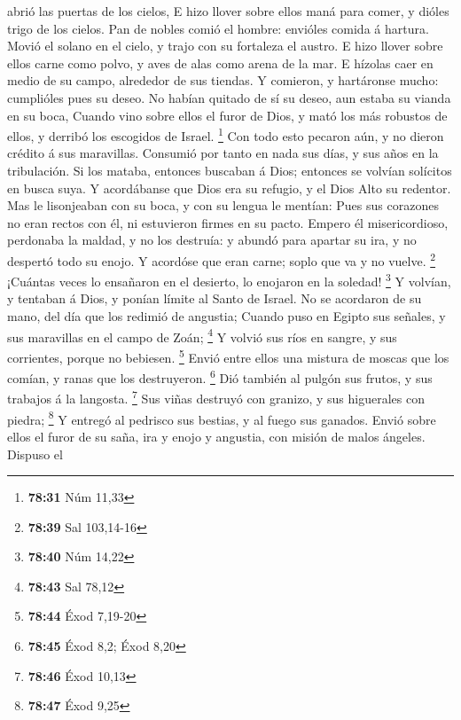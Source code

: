 abrió las puertas de los cielos,  E hizo llover sobre ellos
maná para comer, y dióles trigo de los cielos.  Pan de
nobles comió el hombre: envióles comida á hartura.  Movió
el solano en el cielo, y trajo con su fortaleza el austro. 
E hizo llover sobre ellos carne como polvo, y aves de alas como arena de
la mar.  E hízolas caer en medio de su campo, alrededor de
sus tiendas.  Y comieron, y hartáronse mucho: cumplióles
pues su deseo.  No habían quitado de sí su deseo, aun
estaba su vianda en su boca,  Cuando vino sobre ellos el
furor de Dios, y mató los más robustos de ellos, y derribó los escogidos
de Israel. \footnote{\textbf{78:31} Núm 11,33}  Con todo
esto pecaron aún, y no dieron crédito á sus maravillas. 
Consumió por tanto en nada sus días, y sus años en la tribulación.
 Si los mataba, entonces buscaban á Dios; entonces se
volvían solícitos en busca suya.  Y acordábanse que Dios
era su refugio, y el Dios Alto su redentor.  Mas le
lisonjeaban con su boca, y con su lengua le mentían:  Pues
sus corazones no eran rectos con él, ni estuvieron firmes en su pacto.
 Empero él misericordioso, perdonaba la maldad, y no los
destruía: y abundó para apartar su ira, y no despertó todo su enojo.
 Y acordóse que eran carne; soplo que va y no vuelve.
\footnote{\textbf{78:39} Sal 103,14-16}  ¡Cuántas veces lo
ensañaron en el desierto, lo enojaron en la soledad! \footnote{\textbf{78:40}
  Núm 14,22}  Y volvían, y tentaban á Dios, y ponían límite
al Santo de Israel.  No se acordaron de su mano, del día
que los redimió de angustia;  Cuando puso en Egipto sus
señales, y sus maravillas en el campo de Zoán; \footnote{\textbf{78:43}
  Sal 78,12}  Y volvió sus ríos en sangre, y sus
corrientes, porque no bebiesen. \footnote{\textbf{78:44} Éxod 7,19-20}
 Envió entre ellos una mistura de moscas que los comían, y
ranas que los destruyeron. \footnote{\textbf{78:45} Éxod 8,2; Éxod 8,20}
 Dió también al pulgón sus frutos, y sus trabajos á la
langosta. \footnote{\textbf{78:46} Éxod 10,13}  Sus viñas
destruyó con granizo, y sus higuerales con piedra; \footnote{\textbf{78:47}
  Éxod 9,25}  Y entregó al pedrisco sus bestias, y al fuego
sus ganados.  Envió sobre ellos el furor de su saña, ira y
enojo y angustia, con misión de malos ángeles.  Dispuso el
